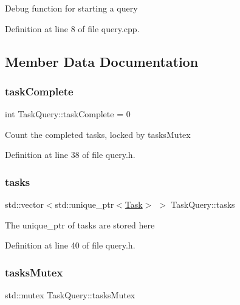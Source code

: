 Debug function for starting a query 

Definition at line 8 of file query.\+cpp.



\subsection{Member Data Documentation}
\mbox{\label{class_task_query_a3dc3e4c56ddea8ff025239fd9da358d3}} 
\subsubsection{\texorpdfstring{task\+Complete}{taskComplete}}
{\footnotesize\ttfamily int Task\+Query\+::task\+Complete = 0\hspace{0.3cm}{\ttfamily [protected]}}

Count the completed tasks, locked by tasks\+Mutex 

Definition at line 38 of file query.\+h.

\mbox{\label{class_task_query_a99c16ac776e6067ba79303396d398819}} 
\subsubsection{\texorpdfstring{tasks}{tasks}}
{\footnotesize\ttfamily std\+::vector$<$std\+::unique\+\_\+ptr$<$\hyperlink{class_task}{Task}$>$ $>$ Task\+Query\+::tasks\hspace{0.3cm}{\ttfamily [protected]}}

The unique\+\_\+ptr of tasks are stored here 

Definition at line 40 of file query.\+h.

\mbox{\label{class_task_query_a147de82af025117cf5ae362dd4d75778}} 
\subsubsection{\texorpdfstring{tasks\+Mutex}{tasksMutex}}
{\footnotesize\ttfamily std\+::mutex Task\+Query\+::tasks\+Mutex\hspace{0.3cm}{\ttfamily [protected]}}

